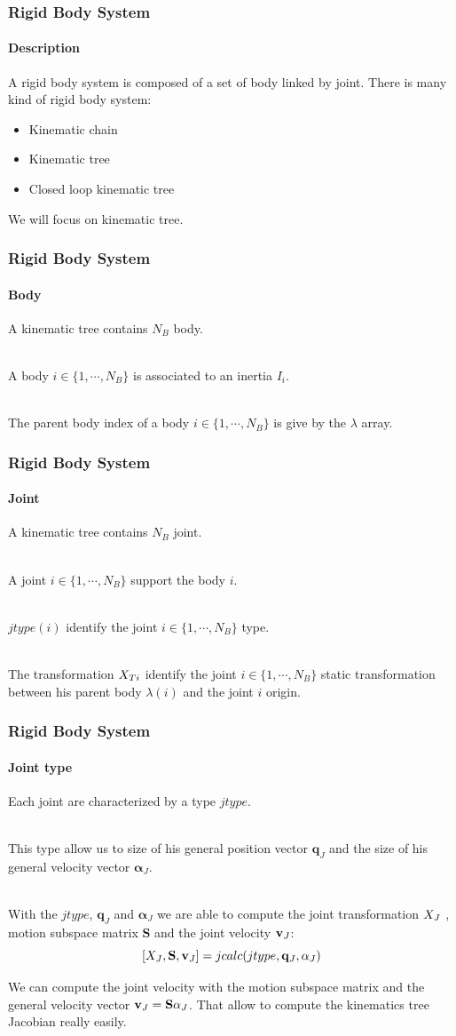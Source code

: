 \documentclass{beamer}
\begin{document}
  	\begin{frame}
		\frametitle{Rigid Body System}
		\framesubtitle{Description}
		A rigid body system is composed of a set of body linked by joint.
		There is many kind of rigid body system:
		\begin{itemize}
			\item Kinematic chain
			\item Kinematic tree
			\item Closed loop kinematic tree
		\end{itemize}
		We will focus on kinematic tree.
	\end{frame}
  	\begin{frame}
		\frametitle{Rigid Body System}
		\framesubtitle{Body}
		A kinematic tree contains $ N_B $ body.

		\hfill \\
		A body $ i \in \{1, \cdots, N_B\} $ is associated to an inertia $ I_i $.

		\hfill \\
		The parent body index of a body $ i \in \{1, \cdots, N_B\} $ is give by the $ \lambda $ array.
	\end{frame}
  	\begin{frame}
		\frametitle{Rigid Body System}
		\framesubtitle{Joint}
		A kinematic tree contains $ N_B $ joint.

		\hfill \\
		A joint $ i \in \{1, \cdots, N_B\} $ support the body $ i $.

		\hfill \\
		$ jtype(i) $ identify the joint $ i \in \{1, \cdots, N_B\} $ type.

		\hfill \\
	        The transformation $ X_{Ti} $ identify the joint $ i \in \{1, \cdots, N_B\} $
		static transformation between his parent body $ \lambda(i) $ and the joint $ i $ origin.
	\end{frame}
  	\begin{frame}
		\frametitle{Rigid Body System}
		\framesubtitle{Joint type}
		Each joint are characterized by a type $ jtype $.

		\hfill \\
		This type allow us to size of his general position vector $ \mathbf{q}_J $ and the size
		of his general velocity vector $ \mathbf{\alpha}_J $.

		\hfill \\
		With the $ jtype $, $ \mathbf{q}_J $ and $ \mathbf{\alpha}_J $ we are able to compute the joint
		transformation $ X_J $ , motion subspace matrix $ \mathbf{S} $ and
		the joint velocity $ \mathbf{v}_J $:
		$$
		[X_J, \mathbf{S}, \mathbf{v}_J] = jcalc(jtype, \mathbf{q}_J, \mathbf{\alpha}_J)
		$$

		We can compute the joint velocity with the motion subspace matrix and
		the general velocity vector $ \mathbf{v}_J = \mathbf{S}\mathbf{\alpha}_J $.
		That allow to compute the kinematics tree Jacobian really easily.
	\end{frame}
\end{document}
